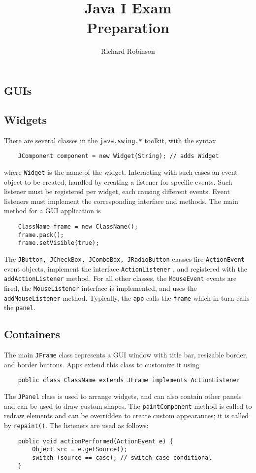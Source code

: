 \documentclass[letterpaper, openany, justified]{tufte-book}
\title{\\Java I Exam \\Preparation}
\author{Richard Robinson}
\newcommand{\cd}[1]{\lstinline{#1}}
\begin{document}
\maketitle
\setlength{\parindent}{0pt}
\begin{fullwidth}

\chapter{GUIs}

\section{Widgets}
There are several classes in the \lstinline{java.swing.*} toolkit, with the syntax \begin{lstlisting}
    JComponent component = new Widget(String); // adds Widget
\end{lstlisting}
where \lstinline{Widget} is the name of the widget. Interacting with such cases an event object to be created, handled by creating a listener for specific events. Such listener must be registered per widget, each causing different events. Event listeners must implement the corresponding interface and methods. The main method for a GUI application is
\begin{lstlisting}
    ClassName frame = new ClassName();
    frame.pack();
    frame.setVisible(true);
\end{lstlisting}
The \lstinline{JButton, JCheckBox, JComboBox, JRadioButton} classes fire \lstinline{ActionEvent} event objects, implement the interface \lstinline{ActionListener} , and registered with the \lstinline{addActionListener} method. For all other classes, the \lstinline{MouseEvent} events are fired, the \lstinline{MouseListener} interface is implemented, and uses the \lstinline{addMouseListener} method. Typically, the \lstinline{app} calls the \cd{frame} which in turn calls the \cd{panel}.

\section{Containers}
The main \lstinline{JFrame} class represents a GUI window with title bar, resizable border, and border buttons. Apps extend this class to customize  it using \begin{lstlisting}
    public class ClassName extends JFrame implements ActionListener
\end{lstlisting}
The \cd{JPanel} class is used to arrange widgets, and can also contain other panels and can be used to draw custom shapes. The \cd{paintComponent} method is called to redraw elements and can be overridden to create custom appearances; it is called by \cd{repaint()}. The listeners are used as follows:
\begin{lstlisting}
    public void actionPerformed(ActionEvent e) {
        Object src = e.getSource();
        switch (source == case); // switch-case conditional
    }
\end{lstlisting}


\end{fullwidth}
\end{document}
